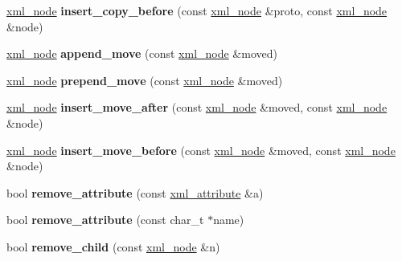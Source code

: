 \begin{DoxyCompactItemize}
\hyperlink{classpugi_1_1xml__node}{xml\+\_\+node} {\bfseries insert\+\_\+copy\+\_\+before} (const \hyperlink{classpugi_1_1xml__node}{xml\+\_\+node} \&proto, const \hyperlink{classpugi_1_1xml__node}{xml\+\_\+node} \&node)
\item 
\mbox{\label{classpugi_1_1xml__node_a25af08bf4e45d2b0380328a0d9d08960}} 
\hyperlink{classpugi_1_1xml__node}{xml\+\_\+node} {\bfseries append\+\_\+move} (const \hyperlink{classpugi_1_1xml__node}{xml\+\_\+node} \&moved)
\item 
\mbox{\label{classpugi_1_1xml__node_a400191f234f22efd0379e68700bf9650}} 
\hyperlink{classpugi_1_1xml__node}{xml\+\_\+node} {\bfseries prepend\+\_\+move} (const \hyperlink{classpugi_1_1xml__node}{xml\+\_\+node} \&moved)
\item 
\mbox{\label{classpugi_1_1xml__node_a23ad17b7d7539169537d95f1fd1ec9b1}} 
\hyperlink{classpugi_1_1xml__node}{xml\+\_\+node} {\bfseries insert\+\_\+move\+\_\+after} (const \hyperlink{classpugi_1_1xml__node}{xml\+\_\+node} \&moved, const \hyperlink{classpugi_1_1xml__node}{xml\+\_\+node} \&node)
\item 
\mbox{\label{classpugi_1_1xml__node_abf67ad284bfbdf8bc401e24b086cf45e}} 
\hyperlink{classpugi_1_1xml__node}{xml\+\_\+node} {\bfseries insert\+\_\+move\+\_\+before} (const \hyperlink{classpugi_1_1xml__node}{xml\+\_\+node} \&moved, const \hyperlink{classpugi_1_1xml__node}{xml\+\_\+node} \&node)
\item 
\mbox{\label{classpugi_1_1xml__node_aee02f0e2dab4aaeb6196f26b3bcf258c}} 
bool {\bfseries remove\+\_\+attribute} (const \hyperlink{classpugi_1_1xml__attribute}{xml\+\_\+attribute} \&a)
\item 
\mbox{\label{classpugi_1_1xml__node_a2625858b335a1289d72d19b57acc639c}} 
bool {\bfseries remove\+\_\+attribute} (const char\+\_\+t $\ast$name)
\item 
\mbox{\label{classpugi_1_1xml__node_a4b562d01edab7dad880e9e297203843d}} 
bool {\bfseries remove\+\_\+child} (const \hyperlink{classpugi_1_1xml__node}{xml\+\_\+node} \&n)
\item 

\end{DoxyCompactItemize}
